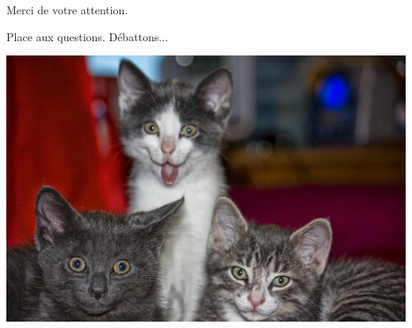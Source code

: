 \documentclass{beamer}
\begin{document}
\begin{frame}
\Huge{\centerline{Merci de votre attention.}}
\Huge{\centerline{Place aux questions. Débattons...}}
\begin{center}
\includegraphics[scale=0.2]{./images/chat.jpg}
\end{center}

\end{frame}
\end{document}
